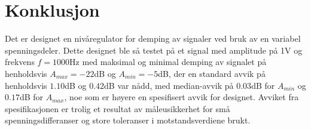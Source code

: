 \section{Konklusjon}
\label{konklusjon}

Det er designet en nivåregulator for demping av signaler ved bruk av 
en variabel spenningsdeler. Dette designet ble så testet på et signal
med amplitude på 1V og frekvens $f = 1000$Hz med maksimal og minimal demping 
av signalet på henholdsvis $A_{max} = -22$dB og $A_{min} = -5$dB, der en standard avvik på 
henholdsvis $1.10$dB og $0.42$dB var nådd, med median-avvik på 
$0.03$dB for $A_{min}$ og $0.17$dB for $A_{max}$, noe som er høyere en spesifisert avvik for designet. 
Avviket fra spesifikasjonen er trolig et resultat av måleusikkerhet for små spenningsdifferanser og 
store toleranser i motstandsverdiene brukt.
